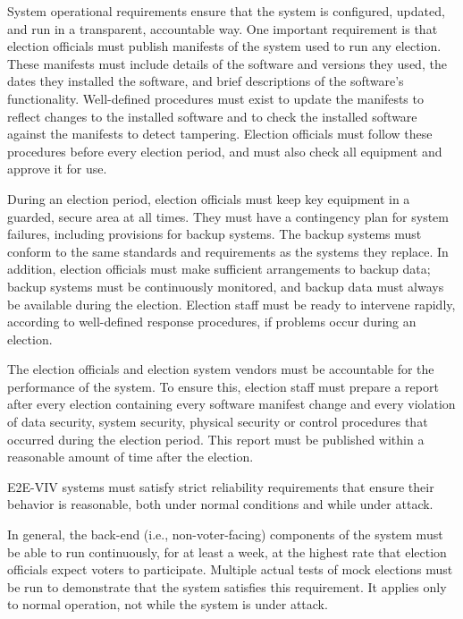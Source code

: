 System operational requirements ensure that the system is configured,
updated, and run in a transparent, accountable way. One important
requirement is that election officials must publish manifests of the
system used to run any election. These manifests must include details
of the software and versions they used, the dates they installed the
software, and brief descriptions of the software's
functionality. Well-defined procedures must exist to update the
manifests to reflect changes to the installed software and to check
the installed software against the manifests to detect
tampering. Election officials must follow these procedures before
every election period, and must also check all equipment and approve
it for use.

During an election period, election officials must keep key equipment
in a guarded, secure area at all times. They must have a contingency
plan for system failures, including provisions for backup systems. The
backup systems must conform to the same standards and requirements as
the systems they replace. In addition, election officials must make
sufficient arrangements to backup data; backup systems must be
continuously monitored, and backup data must always be available
during the election. Election staff must be ready to intervene
rapidly, according to well-defined response procedures, if problems
occur during an election.

The election officials and election system vendors must be accountable
for the performance of the system. To ensure this, election staff must
prepare a report after every election containing every software
manifest change and every violation of data security, system security,
physical security or control procedures that occurred during the
election period. This report must be published within a reasonable
amount of time after the election.


E2E-VIV systems must satisfy strict reliability requirements that
ensure their behavior is reasonable, both under normal conditions and
while under attack.

In general, the back-end (i.e., non-voter-facing) components of the
system must be able to run continuously, for at least a week, at the
highest rate that election officials expect voters to
participate. Multiple actual tests of mock elections must be run to
demonstrate that the system satisfies this requirement. It applies
only to normal operation, not while the system is under attack.

